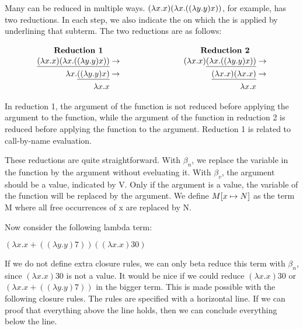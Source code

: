 \vspace{10pt}
Many \lterms can be reduced in multiple ways. $(\lambda x. x)(\lambda x. ((\lambda y. y) x))$, for example, has two reductions.
In each \br step, we also indicate the \bre on which the \br is applied by underlining that subterm. The two reductions are as follows:

\[
	\begin{array}{c c}
		\parbox[c]{0.5\textwidth}{\centering \textbf{Reduction 1}} & \parbox[c]{0.5\textwidth}{\centering \textbf{Reduction 2}} \\
		\vspace{-10pt}                                                                                                          \\
		\begin{aligned}
			\underline{(\lambda x. x)(\lambda x. ((\lambda y. y) x))} & \rightarrow \\
			\lambda x. \underline{((\lambda y. y) x)}                 & \rightarrow \\
			\lambda x. x
		\end{aligned}
		                                                           &
		\begin{aligned}
			(\lambda x. x)\underline{(\lambda x. ((\lambda y. y) x))} & \rightarrow \\
			\underline{(\lambda x. x)(\lambda x. x)}                  & \rightarrow \\
			\lambda x. x
		\end{aligned}
	\end{array}
\]

\vspace{10pt}
In reduction 1, the argument of the function is not reduced before applying the argument to the function, while the argument of the function in reduction 2 is reduced before applying the function to the argument.
Reduction 1 is related to call-by-name evaluation.

\vspace{10pt}
These reductions are quite straightforward. With $\beta_n$, we replace the variable in the function by the argument without eveluating it.
With $\beta_v$, the argument should be a value, indicated by V. Only if the argument is a value, the variable of the function will be replaced by the argument.
We define $M[{x}\mapsto{N}]$ as the term M where all free occurrences of x are replaced by N.

Now consider the following lambda term:

\vspace{10pt}
$(\lambda x. x + ((\lambda y.y)7)) ((\lambda x.x)30)$

\vspace{10pt}
If we do not define extra closure rules, we can only beta reduce this term with $\beta_n$, since $(\lambda x. x) 30$ is not a value.
It would be nice if we could reduce $(\lambda x. x) 30$ or $(\lambda x. x + ((\lambda y.y)7))$ in the bigger term.
This is made possible with the following closure rules. The rules are specified with a horizontal line.
If we can proof that everything above the line holds, then we can conclude everything below the line.

